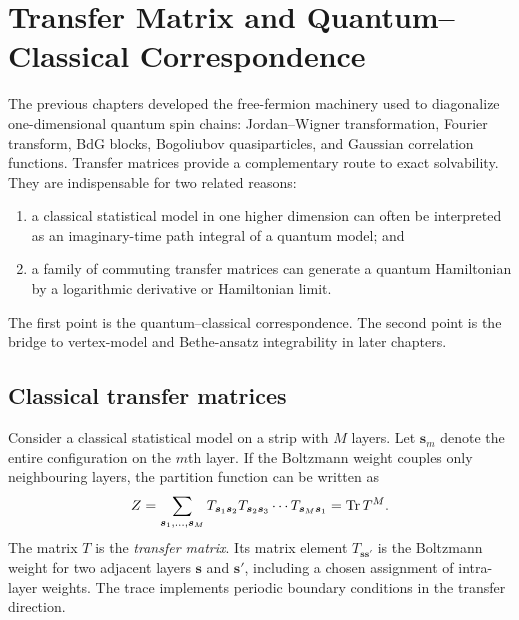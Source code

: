 \chapter{Transfer Matrix and Quantum--Classical Correspondence}
\label{chap:transfer-matrix-quantum-classical}

The previous chapters developed the free-fermion machinery used to diagonalize
one-dimensional quantum spin chains: Jordan--Wigner transformation, Fourier
transform, BdG blocks, Bogoliubov quasiparticles, and Gaussian correlation
functions. Transfer matrices provide a complementary route to exact solvability.
They are indispensable for two related reasons:
\begin{enumerate}[label=(\roman*)]
    \item a classical statistical model in one higher dimension can often be
    interpreted as an imaginary-time path integral of a quantum model; and
    \item a family of commuting transfer matrices can generate a quantum
    Hamiltonian by a logarithmic derivative or Hamiltonian limit.
\end{enumerate}
The first point is the quantum--classical correspondence. The second point is the
bridge to vertex-model and Bethe-ansatz integrability in later chapters.

\section{Classical transfer matrices}
\label{sec:classical-transfer-matrices}

Consider a classical statistical model on a strip with $M$ layers. Let
$\bm{s}_m$ denote the entire configuration on the $m$th layer. If the Boltzmann
weight couples only neighbouring layers, the partition function can be written as
\begin{equation}
\label{eq:transfer-matrix-general-partition-function}
    Z
    =
    \sum_{\bm{s}_1,\ldots,\bm{s}_M}
    T_{\bm{s}_1\bm{s}_2}
    T_{\bm{s}_2\bm{s}_3}
    \cdots
    T_{\bm{s}_M\bm{s}_1}
    =
    \operatorname{Tr} T^M .
\end{equation}
The matrix $T$ is the \emph{transfer matrix}. Its matrix element
$T_{\bm{s}\bm{s}'}$ is the Boltzmann weight for two adjacent layers
$\bm{s}$ and $\bm{s}'$, including a chosen assignment of intra-layer weights.
The trace implements periodic boundary conditions in the transfer direction.

